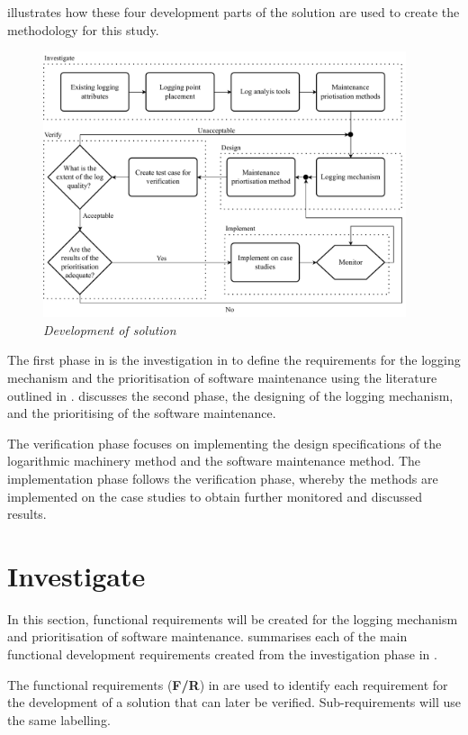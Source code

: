  illustrates how these four development parts of the solution are used to create the methodology for this study.

\begin{figure}[!htb]
	\centering %
	\includegraphics[width=0.95\textwidth]{img/Chapter2/developmentOfSolution/developementOfSolution.pdf}
	\caption[Development of solution]
	{\textit{Development of solution}}\label{fig:ch2_developmentOfSolution}
\end{figure}

The first phase in  is the investigation in  to define the requirements for the logging mechanism and the prioritisation of software maintenance using the literature outlined in .  discusses the second phase, the designing of the logging mechanism, and the prioritising of the software maintenance. 

\clearpage

The verification phase focuses on implementing the design specifications of the logarithmic machinery method and the software maintenance method. The implementation phase follows the verification phase, whereby the methods are implemented on the case studies to obtain further monitored and discussed results.

\section{Investigate}\label{sec:ch2_investigate}
In this section, functional requirements will be created for the logging mechanism and prioritisation of software maintenance.  summarises each of the main functional development requirements created from the investigation phase in . \par The functional requirements (\textbf{F/R}) in  are used to identify each requirement for the development of a solution that can later be verified. Sub-requirements will use the same labelling. 

